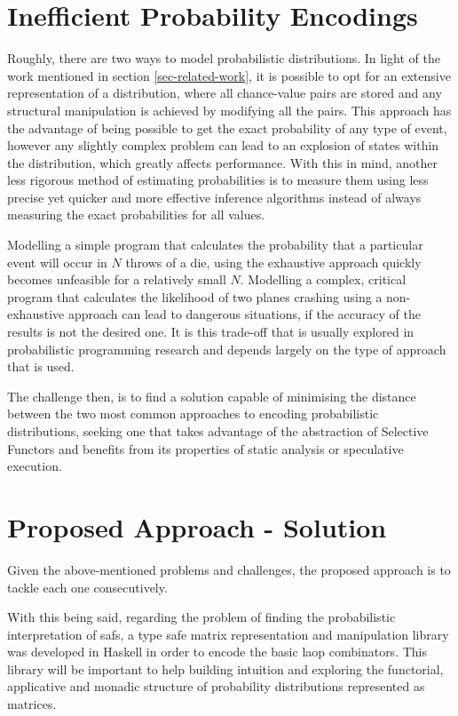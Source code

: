 \documentclass[
  oneside,
  11pt, a4paper,
  footinclude=true,
  headinclude=true,
  cleardoublepage=empty
]{scrbook}
\theoremstyle{definition}
\theoremstyle{definition}
\begin{document}
	\section{Inefficient Probability Encodings}
	
	Roughly, there are two ways to model probabilistic distributions. In light of the work mentioned in section \ref{sec-related-work}, it is possible to opt for an extensive representation of a distribution, where all chance-value pairs are stored and any structural manipulation is achieved by modifying all the pairs. This approach has the advantage of being possible to get the exact probability of any type of event, however any slightly complex problem can lead to an explosion of states within the distribution, which greatly affects performance. With this in mind, another less rigorous method of estimating probabilities is to measure them using less precise yet quicker and more effective inference algorithms instead of always measuring the exact probabilities for all values. 
	
    Modelling a simple program that calculates the probability that a particular event will occur in $N$ throws of a die, using the exhaustive approach quickly becomes unfeasible for a relatively small $N$. Modelling a complex, critical program that calculates the likelihood of two planes crashing using a non-exhaustive approach can lead to dangerous situations, if the accuracy of the results is not the desired one. It is this trade-off that is usually explored in probabilistic programming research and depends largely on the type of approach that is used.

    The challenge then, is to find a solution capable of minimising the distance between the two most common approaches to encoding probabilistic distributions, seeking one that takes advantage of the abstraction of Selective Functors and benefits from its properties of static analysis or speculative execution.
	
	\section{Proposed Approach - Solution}\label{sec-approach}
	
	Given the above-mentioned problems and challenges, the proposed approach is to tackle each one consecutively.
	
	With this being said, regarding the problem of finding the probabilistic interpretation of \glspl{saf}, a type safe matrix representation and manipulation library was developed in Haskell in order to encode the basic \gls{laop} combinators. This library will be important to help building intuition and exploring the functorial, applicative and monadic structure of probability distributions represented as matrices.
	
\end{document}
